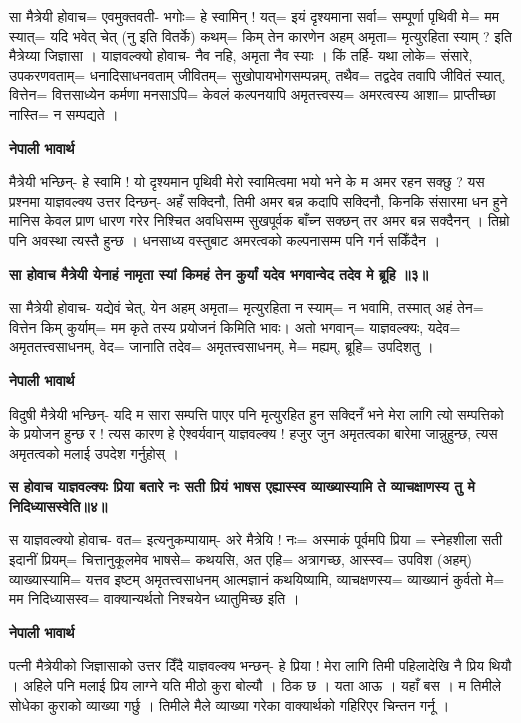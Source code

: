 \documentclass[11pt, a5paper]{article}
\begin{document}
सा मैत्रेयी होवाच‍= एवमुक्तवती- भगोः= हे स्वामिन् ! यत्= इयं दृश्यमाना सर्वा= सम्पूर्णा पृथिवी मे= मम स्यात्= यदि भवेत् चेत् (नु इति वितर्के) कथम्= किम् तेन कारणेन अहम् अमृता= मृत्युरहिता स्याम् ? इति मैत्रेय्या जिज्ञासा । याज्ञवल्क्यो होवाच-  नैव नहि, अमृता नैव स्याः । किं तर्हि- यथा लोके‍= संसारे, उपकरणवताम्= धनादिसाधनवताम् जीवितम्= सुखोपायभोगसम्पन्नम्, तथैव= तद्वदेव तवापि जीवितं स्यात्, वित्तेन= वित्तसाध्येन कर्मणा मनसाऽपि= केवलं कल्पनयापि अमृतत्त्वस्य= अमरत्वस्य आशा= प्राप्तीच्छा नास्ति= न सम्पद्यते ।

\textbf{नेपाली भावार्थ}

मैत्रेयी भन्छिन्- हे स्वामि ! यो दृश्यमान पृथिवी मेरो स्वामित्वमा भयो भने के म अमर रहन सक्छु ? यस प्रश्नमा याज्ञवल्क्य उत्तर दिन्छन्- अहँ सक्दिनौ, तिमी अमर बन्न कदापि सक्दिनौ, किनकि संसारमा धन हुने मानिस केवल प्राण धारण गरेर निश्चित अवधिसम्म सुखपूर्वक बाँच्न सक्छन् तर अमर बन्न सक्दैनन् । तिम्रो पनि अवस्था त्यस्तै हुन्छ । धनसाध्य वस्तुबाट अमरत्वको कल्पनासम्म पनि गर्न सकिँदैन ।

\textbf{सा होवाच मैत्रेयी येनाहं नामृता स्यां किमहं तेन कुर्यां यदेव भगवान्वेद तदेव मे ब्रूहि ॥३॥}

सा मैत्रेयी होवाच- यद्येवं चेत्, येन अहम् अमृता= मृत्युरहिता न स्याम्= न भवामि, तस्मात् अहं तेन= वित्तेन किम् कुर्याम्= मम कृते तस्य प्रयोजनं किमिति भावः। अतो भगवान्= याज्ञवल्क्यः, यदेव= अमृततत्त्वसाधनम्, वेद= जानाति तदेव= अमृतत्त्वसाधनम्, मे= मह्यम्, ब्रूहि= उपदिशतु ।

\textbf{नेपाली भावार्थ}

विदुषी मैत्रेयी भन्छिन्- यदि म सारा सम्पत्ति पाएर पनि मृत्युरहित हुन सक्दिनँ भने मेरा लागि त्यो सम्पत्तिको के प्रयोजन हुन्छ र ! त्यस कारण हे ऐश्वर्यवान् याज्ञवल्क्य ! हजुर जुन अमृतत्वका बारेमा जान्नुहुन्छ, त्यस अमृतत्वको मलाई उपदेश गर्नुहोस् ।

\textbf{स होवाच याज्ञवल्क्यः प्रिया बतारे नः सती प्रियं भाषस एह्यास्स्व व्याख्यास्यामि ते व्याचक्षाणस्य तु मे निदिध्यासस्वेति॥४॥}

स याज्ञवल्क्यो होवाच- वत= इत्यनुकम्पायाम्- अरे मैत्रेयि ! नः= अस्माकं पूर्वमपि प्रिया = स्नेहशीला सती इदानीं प्रियम्= चित्तानुकूलमेव भाषसे= कथयसि, अत एहि= अत्रागच्छ, आस्स्व= उपविश (अहम्) व्याख्यास्यामि= यत्तव इष्टम् अमृतत्त्वसाधनम् आत्मज्ञानं कथयिष्यामि, व्याचक्षणस्य= व्याख्यानं कुर्वतो मे= मम निदिध्यासस्व= वाक्यान्यर्थतो निश्चयेन ध्यातुमिच्छ इति ।

\textbf{नेपाली भावार्थ}

पत्नी मैत्रेयीको जिज्ञासाको उत्तर दिँदै याज्ञवल्क्य भन्छन्- हे प्रिया ! मेरा लागि त‍िमी पहिलादेखि नै प्रिय थियौ । अहिले पनि मलाई प्रिय लाग्ने यति मीठो कुरा बोल्यौ । ठिक छ । यता आऊ । यहाँ बस । म तिमीले सोधेका कुराको व्याख्या गर्छु । तिमीले मैले व्याख्या गरेका वाक्यार्थको गहिरिएर चिन्तन गर्नू ।
\end{document}
